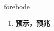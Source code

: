 
\begin{frame}
{\huge forebode}
\begin{center}
\begin{enumerate}\Large
  \item \textbf{预示，预兆}
\end{enumerate}
\end{center}
\end{frame}
